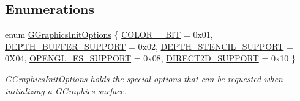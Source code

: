 \subsection*{Enumerations}
\begin{DoxyCompactItemize}
\item 
enum \mbox{\hyperlink{namespace_g_w_1_1_g_r_a_p_h_i_c_s_afbd9d6f65375744d2338ce060d42c85b}{G\+Graphics\+Init\+Options}} \{ \newline
\mbox{\hyperlink{namespace_g_w_1_1_g_r_a_p_h_i_c_s_afbd9d6f65375744d2338ce060d42c85ba955a3a5f0ed41c744182916c5bf68e15}{C\+O\+L\+O\+R\+\_\+\_\+\+B\+IT}} = 0x01, 
\mbox{\hyperlink{namespace_g_w_1_1_g_r_a_p_h_i_c_s_afbd9d6f65375744d2338ce060d42c85ba1bade4c85d55718f2b27dcc38c332a3a}{D\+E\+P\+T\+H\+\_\+\+B\+U\+F\+F\+E\+R\+\_\+\+S\+U\+P\+P\+O\+RT}} = 0x02, 
\mbox{\hyperlink{namespace_g_w_1_1_g_r_a_p_h_i_c_s_afbd9d6f65375744d2338ce060d42c85bacac34b90e4af450189dd5e824cbbd452}{D\+E\+P\+T\+H\+\_\+\+S\+T\+E\+N\+C\+I\+L\+\_\+\+S\+U\+P\+P\+O\+RT}} = 0\+X04, 
\mbox{\hyperlink{namespace_g_w_1_1_g_r_a_p_h_i_c_s_afbd9d6f65375744d2338ce060d42c85bae59cf357d12d379a206c08211dedc57f}{O\+P\+E\+N\+G\+L\+\_\+\+E\+S\+\_\+\+S\+U\+P\+P\+O\+RT}} = 0x08, 
\newline
\mbox{\hyperlink{namespace_g_w_1_1_g_r_a_p_h_i_c_s_afbd9d6f65375744d2338ce060d42c85ba9c847baaca0bdcb897b2332cc8d3b5dc}{D\+I\+R\+E\+C\+T2\+D\+\_\+\+S\+U\+P\+P\+O\+RT}} = 0x10
 \}
\begin{DoxyCompactList}\small\item\em G\+Graphics\+Init\+Options holds the special options that can be requested when initializing a G\+Graphics surface. \end{DoxyCompactList}\end{DoxyCompactItemize}
